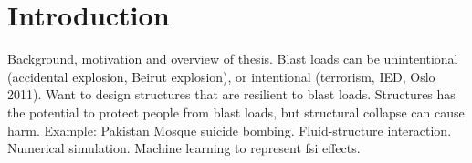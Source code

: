 \chapter{Introduction} \label{chapter:Introduction}
Background, motivation and overview of thesis.
Blast loads can be unintentional (accidental explosion, Beirut explosion), or intentional (terrorism, IED, Oslo 2011). Want to design structures that are resilient to blast loads. Structures has the potential to protect people from blast loads, but structural collapse can cause harm. Example: Pakistan Mosque suicide bombing.
Fluid-structure interaction. Numerical simulation. Machine learning to represent fsi effects.